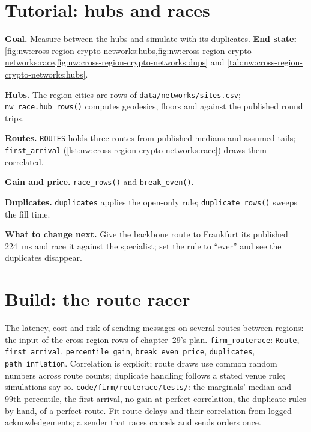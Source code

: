 \section{Tutorial: hubs and races}\label{tut:nw:cross-region-crypto-networks:tut}

\begin{tutorial}
\textbf{Goal.} Measure  between the hubs and simulate  with its duplicates.
\textbf{End state:} \cref{fig:nw:cross-region-crypto-networks:hubs,fig:nw:cross-region-crypto-networks:race,fig:nw:cross-region-crypto-networks:dups}
and \cref{tab:nw:cross-region-crypto-networks:hubs}.
\begin{tutsteps}
\item \textbf{Hubs.} The region cities are rows of \texttt{data/networks/sites.csv}; \texttt{nw\_race.hub\_rows()} computes geodesics, floors and
   against the published round trips.
\item \textbf{Routes.} \texttt{ROUTES} holds three routes from published medians and assumed tails; \texttt{first\_arrival}
  (\cref{lst:nw:cross-region-crypto-networks:race}) draws them correlated.
\item \textbf{Gain and price.} \texttt{race\_rows()} and \texttt{break\_even()}.
\item \textbf{Duplicates.} \texttt{duplicates} applies the open-only rule; \texttt{duplicate\_rows()} sweeps the fill time.
\end{tutsteps}
\textbf{What to change next.} Give the backbone route to Frankfurt its published 224~ms and race it against the specialist; set the rule to
``ever'' and see the duplicates disappear.
\end{tutorial}

\section{Build: the route racer}\label{bld:nw:cross-region-crypto-networks:routerace}

\begin{build}
 The latency, cost and risk of sending messages on several routes between regions: the input of the cross-region rows of chapter~29's
plan.
 \texttt{firm\_routerace}: \texttt{Route}, \texttt{first\_arrival}, \texttt{percentile\_gain}, \texttt{break\_even\_price},
\texttt{duplicates}, \texttt{path\_inflation}.
 Correlation is explicit; route draws use common random numbers across route counts; duplicate handling follows a stated venue rule;
simulations say so.
 \texttt{code/firm/routerace/tests/}: the marginals' median and 99th percentile, the first arrival, no gain at perfect
correlation, the duplicate rules by hand,  of a perfect route.
 Fit route delays and their correlation from logged acknowledgements; a sender that races cancels and sends orders once.
\end{build}


